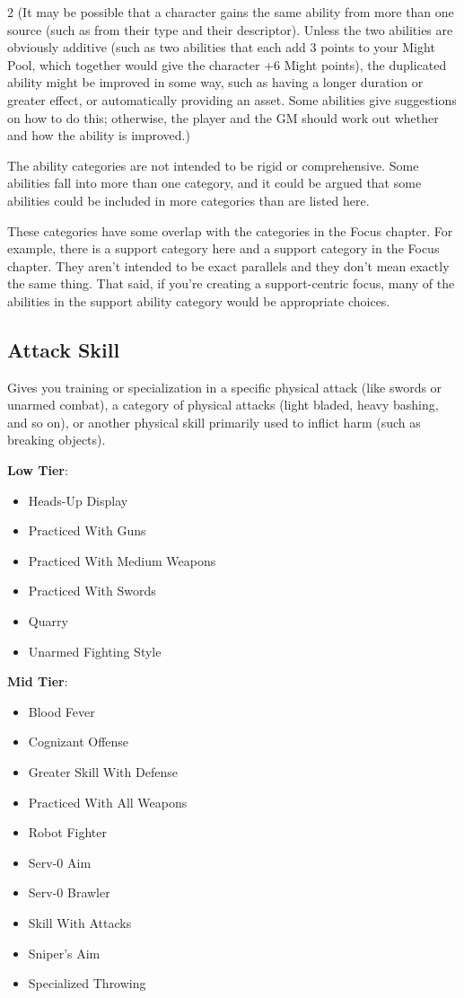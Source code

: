 \begin{multicols}{2}
(It may be possible that a character gains the same ability from more than one source (such as from their type and their descriptor). Unless the two abilities are obviously additive (such as two abilities that each add 3 points to your Might Pool, which together would give the character +6 Might points), the duplicated ability might be improved in some way, such as having a longer duration or greater effect, or automatically providing an asset. Some abilities give suggestions on how to do this; otherwise, the player and the GM should work out whether and how the ability is improved.)

The ability categories are not intended to be rigid or comprehensive. Some abilities fall into more than one category, and it could be argued that some abilities could be included in more categories than are listed here.

These categories have some overlap with the categories in the Focus chapter. For example, there is a support category here and a support category in the Focus chapter. They aren’t intended to be exact parallels and they don’t mean exactly the same thing. That said, if you’re creating a support-centric focus, many of the abilities in the support ability category would be appropriate choices.

\subsection{Attack Skill}

Gives you training or specialization in a specific physical attack (like swords or unarmed combat), a category of physical attacks (light bladed, heavy bashing, and so on), or another physical skill primarily used to inflict harm (such as breaking objects).

\textbf{Low Tier}:

\begin{itemize}
\item Heads-Up Display
\item Practiced With Guns
\item Practiced With Medium Weapons
\item Practiced With Swords
\item Quarry
\item Unarmed Fighting Style
\end{itemize}

\textbf{Mid Tier}:

\begin{itemize}
\item Blood Fever
\item Cognizant Offense
\item Greater Skill With Defense
\item Practiced With All Weapons
\item Robot Fighter
\item Serv-0 Aim
\item Serv-0 Brawler
\item Skill With Attacks
\item Sniper’s Aim
\item Specialized Throwing
\end{itemize}


\end{multicols}
